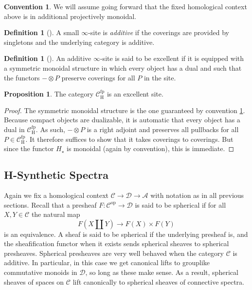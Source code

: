 \documentclass[10pt]{amsart}
\theoremstyle{definition}
\numberwithin{figure}{section}
\numberwithin{equation}{section}
\newtheorem{proposition}[figure]{Proposition}
\newtheorem{definition}[figure]{Definition}
\newtheorem{convention}[figure]{Convention}
\newcommand{\op}{\mathrm{op}}
\newcommand{\cA}{\mathcal{A}}
\newcommand{\cC}{\mathcal{C}}
\newcommand{\cD}{\mathcal{D}}
\theoremstyle{cited}
\newcommand{\fp}{\mathrm{fp}}
\renewcommand{\H}{\mathrm{H}}
\begin{document}
\begin{convention}\label{conv:projectivemonoidality}
  We will assume going forward that the fixed homological context above is in additional projectively monoidal.
\end{convention}

\begin{definition}[\cite{Pst22}]
  A small $\infty$-site is \textit{additive} if the coverings are provided by singletons and the underlying category is additive. 
\end{definition}

\begin{definition}[\cite{Pst22}]
  An additive $\infty$-site is said to be excellent if it is equipped with a symmetric monoidal structure in which every object has a dual and such that the functors $-\otimes P$ preserve coverings for all $P$ in the site.
\end{definition}

\begin{proposition}
  The category $\cC^\fp_\H$ is an excellent site.
\end{proposition}

\begin{proof}
  The symmetric monoidal structure is the one guaranteed by convention \ref{conv:projectivemonoidality}. Because compact objects are dualizable, it is automatic that every object has a dual in $\cC^\fp_\H$. As such, $-\otimes P$ is a right adjoint and preserves all pullbacks for all $P\in \cC^\fp_\H$. It therefore suffices to show that it takes coverings to coverings. But since the functor $H_\star$ is monoidal (again by convention), this is immediate.
\end{proof}

\subsection{H-Synthetic Spectra}

Again we fix a homological context $\cC\to \cD\to \cA$ with notation as in all previous sections. Recall that a presheaf $F:\cC^\op\to \cD$ is said to be spherical if for all $X,Y\in \cC$ the natural map
\[
F(X\amalg Y)\to F(X)\times F(Y)
\]
is an equivalence. A sheaf is said to be spherical if the underlying presheaf is, and the sheafification functor when it exists sends spherical sheaves to spherical presheaves. Spherical presheaves are very well behaved when the category $\cC$ is additive. In particular, in this case we get canonical lifts to grouplike commutative monoids in $\cD$, so long as these make sense. As a result, spherical sheaves of spaces on $\cC$ lift canonically to spherical sheaves of connective spectra.
\end{document}
